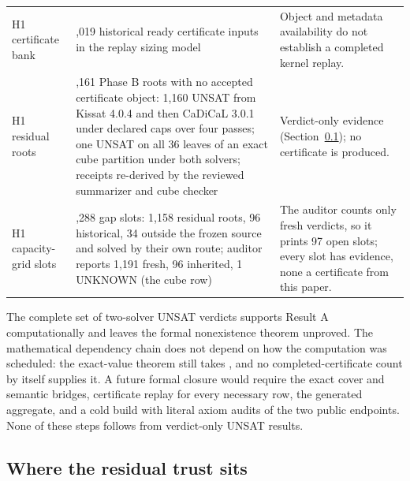 \documentclass{anvil-paper}
\newcommand{\hnoFortyNine}{\lean{hno49}}
\theoremstyle{definition}
\begin{document}
\begin{table}[htbp]
\begin{tabularx}{\textwidth}{@{}>{\raggedright\arraybackslash}p{}>{\raggedright\arraybackslash}X>{\raggedright\arraybackslash}p{}@{}}
H1 certificate bank & 12,019 historical ready certificate inputs in the replay sizing model & Object and metadata availability do not establish a completed kernel replay. \\
H1 residual roots & 1,161 Phase B roots with no accepted certificate object: 1,160 UNSAT from Kissat 4.0.4 and then CaDiCaL 3.0.1 under declared caps over four passes; one UNSAT on all 36 leaves of an exact cube partition under both solvers; receipts re-derived by the reviewed summarizer and cube checker & Verdict-only evidence (Section~\ref{sec:trust}); no certificate is produced. \\
H1 capacity-grid slots & 1,288 gap slots: 1,158 residual roots, 96 historical, 34 outside the frozen source and solved by their own route; auditor reports 1,191 fresh, 96 inherited, 1 UNKNOWN (the cube row) & The auditor counts only fresh verdicts, so it prints 97 open slots; every slot has evidence, none a certificate from this paper. \\
\bottomrule
\end{tabularx}
\end{table}

The complete set of two-solver UNSAT verdicts supports Result A computationally and leaves the formal nonexistence theorem unproved. The mathematical dependency chain does not depend on how the computation was scheduled: the exact-value theorem still takes \hnoFortyNine, and no completed-certificate count by itself supplies it. A future formal closure would require the exact cover and semantic bridges, certificate replay for every necessary row, the generated aggregate, and a cold build with literal axiom audits of the two public endpoints. None of these steps follows from verdict-only UNSAT results.

\subsection{Where the residual trust sits}\label{sec:trust}
\end{document}
